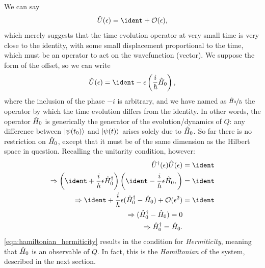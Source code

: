 We can say
\begin{equation}
    \hat{U}(\epsilon) = \ident + \mathcal{O}(\epsilon),
\end{equation}
which merely suggests that the time evolution operator
    at very small time is very close to the identity, with some small displacement proportional to the time,
    which must be an operator to act on the wavefunction (vector).
We suppose the form of the offset, so we can write
\begin{equation}
    \hat{U}(\epsilon) = \ident - \epsilon \left(\frac{i}{\hbar} \ho \right),
\end{equation}
    where the inclusion of the phase $-i$ is arbitrary, 
    and we have named as $\nicefrac{\hat{H}_0}{\hbar}$ the operator by which the time evolution differs from the identity. 
In other words, the operator $\hat{H}_0$ is generically the generator of the evolution/dynamics of $Q$:
    any difference between $\ket{\psi(t_0)}$ and $\ket{\psi(t)}$ arises solely due to $\hat{H}_0$. 
So far there is no restriction on $\hat{H}_0$, 
    except that it must be of the same dimension as the Hilbert space in question. 
Recalling the unitarity condition, however:
\begin{equation}
    \label{eqn:hamiltonian_hermiticity}
    \begin{split}
        \hat{U}^{\dag}(\epsilon) \hat{U}(\epsilon) &= \ident
        \\ 
        \Rightarrow 
        \left( \ident + \frac{i}{\hbar} \epsilon \ho^\dag \right) \left( \ident - \frac{i}{\hbar} \epsilon \ho, \right)  &= \ident
        \\
        \Rightarrow
        \ident +  \frac{i}{\hbar} \epsilon (\ho^{\dag} - \ho) + \mathcal{O}(\epsilon^2) &= \ident
        \\
        \Rightarrow
        (\ho^{\dag} - \ho) = 0 
        \\
        \Rightarrow
        \ho^{\dag} = \ho.
    \end{split}
\end{equation}
\cref{eqn:hamiltonian_hermiticity} results in the condition for \emph{Hermiticity}, 
    meaning that $\hat{H}_0$ is an observable of $Q$. 
In fact, this is the \emph{Hamiltonian} of the system, described in the next section. 

